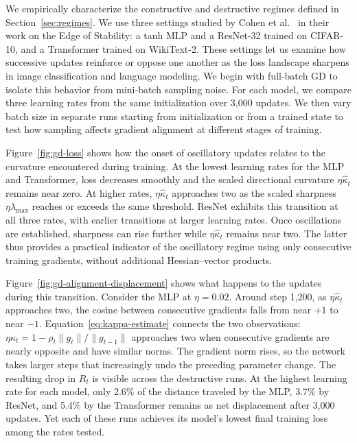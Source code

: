 We empirically characterize the constructive and destructive regimes defined in Section~\ref{sec:regimes}. We use three settings studied by Cohen et al.~\cite{cohen2021edge} in their work on the Edge of Stability: a tanh MLP and a ResNet-32 trained on CIFAR-10, and a Transformer trained on WikiText-2. These settings let us examine how successive updates reinforce or oppose one another as the loss landscape sharpens in image classification and language modeling. We begin with full-batch GD to isolate this behavior from mini-batch sampling noise. For each model, we compare three learning rates from the same initialization over 3,000 updates. We then vary batch size in separate runs starting from initialization or from a trained state to test how sampling affects gradient alignment at different stages of training.

Figure~\ref{fig:gd-loss} shows how the onset of oscillatory updates relates to the curvature encountered during training. At the lowest learning rates for the MLP and Transformer, loss decreases smoothly and the scaled directional curvature $\eta\widehat\kappa_t$ remains near zero. At higher rates, $\eta\widehat\kappa_t$ approaches two as the scaled sharpness $\eta\lambda_{\max}$ reaches or exceeds the same threshold. ResNet exhibits this transition at all three rates, with earlier transitions at larger learning rates. Once oscillations are established, sharpness can rise further while $\eta\widehat\kappa_t$ remains near two. The latter thus provides a practical indicator of the oscillatory regime using only consecutive training gradients, without additional Hessian--vector products.

Figure~\ref{fig:gd-alignment-displacement} shows what happens to the updates during this transition. Consider the MLP at $\eta=0.02$. Around step 1,200, as $\eta\widehat\kappa_t$ approaches two, the cosine between consecutive gradients falls from near $+1$ to near $-1$. Equation~\eqref{eq:kappa-estimate} connects the two observations: $\eta\widehat\kappa_t=1-\rho_t\|g_t\|/\|g_{t-1}\|$ approaches two when consecutive gradients are nearly opposite and have similar norms. The gradient norm rises, so the network takes larger steps that increasingly undo the preceding parameter change. The resulting drop in $R_t$ is visible across the destructive runs. At the highest learning rate for each model, only 2.6\% of the distance traveled by the MLP, 3.7\% by ResNet, and 5.4\% by the Transformer remains as net displacement after 3,000 updates. Yet each of these runs achieves its model's lowest final training loss among the rates tested.

